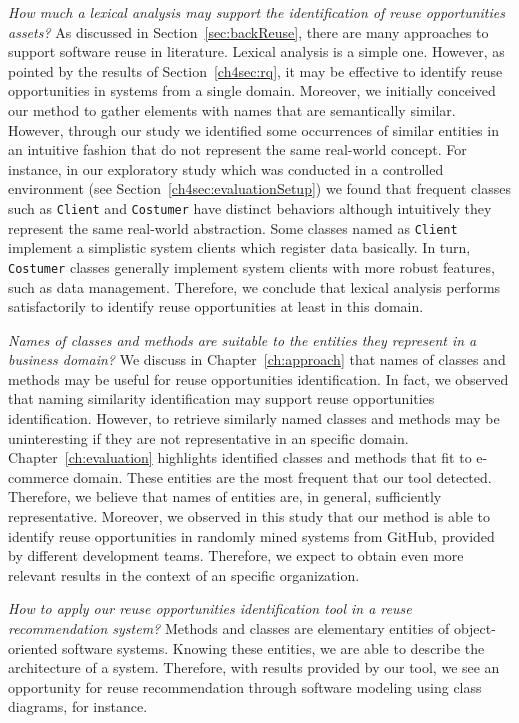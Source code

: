 

\textit{How much a lexical analysis may support the identification of reuse opportunities assets?} As discussed in Section~\ref{sec:backReuse}, there are many approaches to support software reuse in literature. Lexical analysis is a simple one. However, as pointed by the results of Section~\ref{ch4sec:rq}, it may be effective to identify reuse opportunities in systems from a single domain. Moreover, we initially conceived our method to gather elements with names that are semantically similar. However, through our study we identified some occurrences of similar entities in an intuitive fashion that do not represent the same real-world concept. For instance, in our exploratory study which was conducted in a controlled environment (see Section~\ref{ch4sec:evaluationSetup}) we found that frequent classes such as \texttt{Client} and \texttt{Costumer} have distinct behaviors although intuitively they represent the same real-world abstraction. Some classes named as \texttt{Client} implement a simplistic system clients which register data basically. In turn, \texttt{Costumer} classes generally implement system clients with more robust features, such as data management. Therefore, we conclude that lexical analysis performs satisfactorily to identify reuse opportunities at least in this domain.

\textit{Names of classes and methods are suitable to the entities they represent in a business domain?} We discuss in Chapter~\ref{ch:approach} that names of classes and methods may be useful for reuse opportunities identification. In fact, we observed that naming similarity identification may support reuse opportunities identification. However, to retrieve similarly named classes and methods may be uninteresting if they are not representative in an specific domain. Chapter~\ref{ch:evaluation} highlights identified classes and methods that fit to e-commerce domain. These entities are the  most frequent that our tool detected. Therefore, we believe that names of entities are, in general, sufficiently representative. Moreover, we observed in this study that our method is able to identify reuse opportunities in randomly mined systems from GitHub, provided by different development teams. Therefore, we expect to obtain even  more relevant results in the context of an specific organization.

\textit{How to apply our reuse opportunities  identification tool in a reuse recommendation system?} Methods and classes are elementary entities of object-oriented software systems. Knowing these entities, we are able to describe the architecture of a system. Therefore, with results provided by our tool, we see an opportunity for reuse recommendation through software modeling using class diagrams, for instance. %

